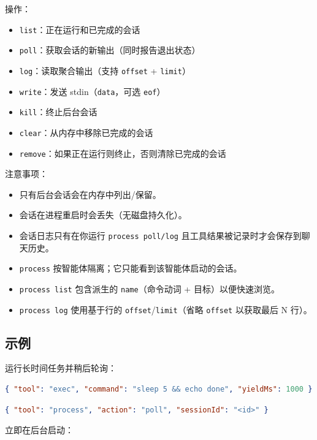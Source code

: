 操作：

\begin{itemize}
  \item \texttt{list}：正在运行和已完成的会话
  \item \texttt{poll}：获取会话的新输出（同时报告退出状态）
  \item \texttt{log}：读取聚合输出（支持 \texttt{offset} + \texttt{limit}）
  \item \texttt{write}：发送 stdin（\texttt{data}，可选 \texttt{eof}）
  \item \texttt{kill}：终止后台会话
  \item \texttt{clear}：从内存中移除已完成的会话
  \item \texttt{remove}：如果正在运行则终止，否则清除已完成的会话
\end{itemize}


注意事项：

\begin{itemize}
  \item 只有后台会话会在内存中列出/保留。
  \item 会话在进程重启时会丢失（无磁盘持久化）。
  \item 会话日志只有在你运行 \texttt{process poll/log} 且工具结果被记录时才会保存到聊天历史。
  \item \texttt{process} 按智能体隔离；它只能看到该智能体启动的会话。
  \item \texttt{process list} 包含派生的 \texttt{name}（命令动词 + 目标）以便快速浏览。
  \item \texttt{process log} 使用基于行的 \texttt{offset}/\texttt{limit}（省略 \texttt{offset} 以获取最后 N 行）。
\end{itemize}


\subsection{示例}


运行长时间任务并稍后轮询：

\begin{lstlisting}[language=json]
{ "tool": "exec", "command": "sleep 5 && echo done", "yieldMs": 1000 }
\end{lstlisting}


\begin{lstlisting}[language=json]
{ "tool": "process", "action": "poll", "sessionId": "<id>" }
\end{lstlisting}


立即在后台启动：


